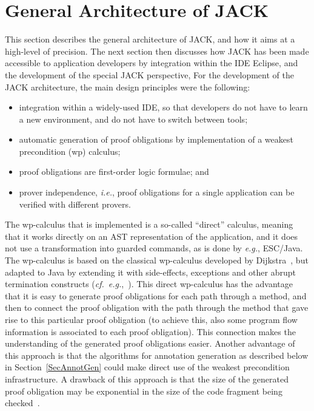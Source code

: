 
\section{General Architecture of JACK}\label{SecArchitecture}

This section describes the general architecture of JACK, and how it
aims at a high-level of precision.  The next section then discusses
how JACK has been made accessible to application developers by
integration within the IDE Eclipse, and the development of the special
JACK perspective, For the development of the JACK architecture, the
main design principles were the following:
\begin{itemize}
\item integration within a widely-used IDE, so that developers do not
have to learn a new environment, and do not have to switch between tools;
\item automatic generation of proof obligations by
implementation of a weakest precondition (wp) calculus;
\item proof obligations are first-order logic formulae; and
\item prover independence, \emph{i.e.}, proof obligations for
a single application can be verified with different provers.
\end{itemize}

The wp-calculus that is implemented is a so-called ``direct''
calculus, meaning that it works directly on an AST representation of
the application, and it does not use a transformation into guarded
commands, as is done by \emph{e.g.},  ESC/Java.  The wp-calculus is
based on the classical wp-calculus developed by
Dijkstra~\cite{Dijkstra75}, but adapted to Java by extending it with
side-effects, exceptions and other abrupt termination constructs
(\emph{cf.}\
\emph{e.g.},~\cite{Jacobs04}). This direct wp-calculus has the advantage
that it is easy to generate proof obligations for each path through a
method, and then to connect the proof obligation with the path through
the method that gave rise to this particular proof obligation (to
achieve this, also some program flow information is associated to each
proof obligation). This connection makes the understanding of the
generated proof obligations easier. Another advantage of this approach
is that the algorithms for annotation generation as described below in
Section~\ref{SecAnnotGen} could make direct use of the weakest
precondition infrastructure. A drawback of this approach is that the
size of the generated proof obligation may be exponential in the size
of the code fragment being checked~\cite{FlanaganS01}.


